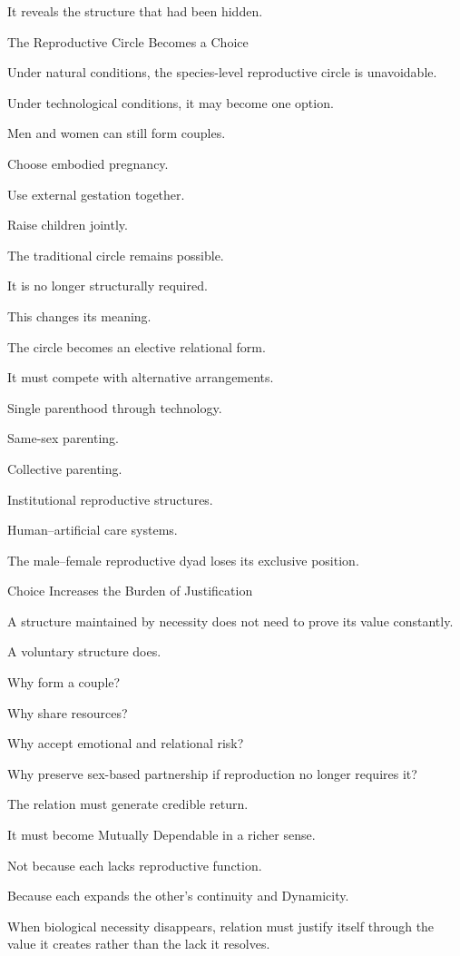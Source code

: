 It reveals the structure that had been hidden.

The Reproductive Circle Becomes a Choice

Under natural conditions, the species-level reproductive circle is unavoidable.

Under technological conditions, it may become one option.

Men and women can still form couples.

Choose embodied pregnancy.

Use external gestation together.

Raise children jointly.

The traditional circle remains possible.

It is no longer structurally required.

This changes its meaning.

The circle becomes an elective relational form.

It must compete with alternative arrangements.

Single parenthood through technology.

Same-sex parenting.

Collective parenting.

Institutional reproductive structures.

Human–artificial care systems.

The male–female reproductive dyad loses its exclusive position.

Choice Increases the Burden of Justification

A structure maintained by necessity does not need to prove its value constantly.

A voluntary structure does.

Why form a couple?

Why share resources?

Why accept emotional and relational risk?

Why preserve sex-based partnership if reproduction no longer requires it?

The relation must generate credible return.

It must become Mutually Dependable in a richer sense.

Not because each lacks reproductive function.

Because each expands the other’s continuity and Dynamicity.

When biological necessity disappears, relation must justify itself through the value it creates rather than the lack it resolves.

